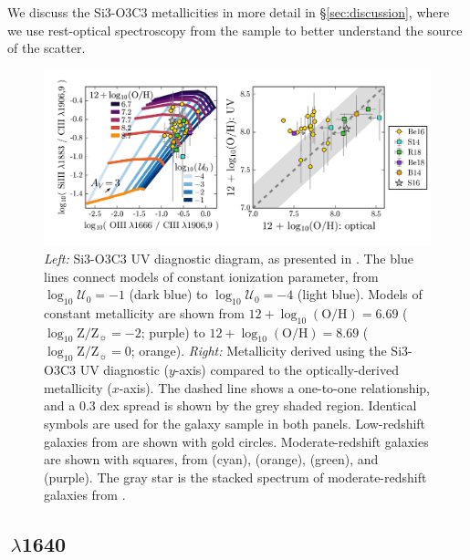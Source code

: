 \documentclass[preprint2]{aastex62}
\newcommand{\heii}{\ion{He}{2}}
\newcommand{\logten}{\ensuremath{\log_{10}}}
\newcommand{\logOH}{\ensuremath{\logten (\mathrm{O}/\mathrm{H})}\xspace}
\newcommand{\logZeq}[1]{\ensuremath{\logten \mathrm{Z}/\mathrm{Z}_{\sun} = #1}}
\newcommand{\logUeq}[1]{\ensuremath{\logten \mathcal{U}_0 = #1}}
\begin{document}
We discuss the Si3-O3C3 metallicities in more detail in \S\ref{sec:discussion}, where we use rest-optical spectroscopy from the \citet{Berg+2016} sample to better understand the source of the scatter.

\begin{figure}
  \begin{center}
    \includegraphics[width=\linewidth]{figs/f3.png}
    \caption{\emph{Left:} Si3-O3C3 UV diagnostic diagram, as presented in . The blue lines connect models of constant ionization parameter, from \logUeq{-1} (dark blue) to \logUeq{-4} (light blue). Models of constant metallicity are shown from $12+\logOH=6.69$ (\logZeq{-2}; purple) to $12+\logOH=8.69$ (\logZeq{0}; orange). \emph{Right:} Metallicity derived using the Si3-O3C3 UV diagnostic ($y$-axis) compared to the optically-derived metallicity ($x$-axis). The dashed line shows a one-to-one relationship, and a 0.3 dex spread is shown by the grey shaded region. Identical symbols are used for the galaxy sample in both panels. Low-redshift galaxies from \citet{Berg+2016} are shown with gold circles. Moderate-redshift galaxies are shown with squares, from \citet{Stark+2014} (cyan), \citet{Bayliss+2014} (orange), \citet{Rigby+2018b} (green), and \citet{Berg+2018} (purple). The gray star is the stacked spectrum of moderate-redshift galaxies from \citet{Steidel+2016}.}
    \label{fig:UVSi}
  \end{center}
\end{figure}

\subsection{\heii$\,\lambda$1640}\label{sec:ZZ:He}
\end{document}
